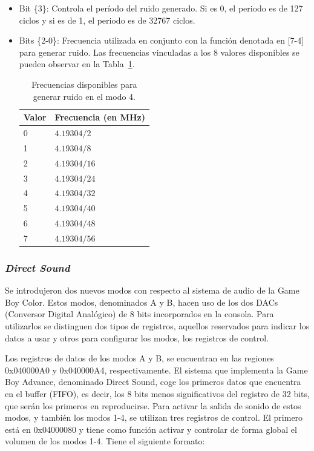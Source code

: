 {\begin{itemize}
	\begin{align}
		Q/2^{valor+1}
		\label{eq:fn_canal_4}
	\end{align}

	\item Bit \{3\}: Controla el período del ruido generado. Si es 0, el periodo es de 127 ciclos y si es de 1, el periodo es de 32767 ciclos.
	\item Bits \{2-0\}: Frecuencia utilizada en conjunto con la función denotada en [7-4] para generar ruido. Las frecuencias vinculadas a los 8 valores disponibles se pueden observar en la Tabla~\ref{tab:frec_canal_4}.

	\begin{table}[h]
		\centering
		\begin{tabular}{| l | l |}
			\hline
			\textbf{Valor} & \textbf{Frecuencia (en MHz)}  \\ \hline
			0 & $4.19304/2$ \\ \hline
			1 & $4.19304/8$ \\ \hline
			2 & $4.19304/16$ \\ \hline
			3 & $4.19304/24$ \\ \hline
			4 & $4.19304/32$ \\ \hline
			5 & $4.19304/40$ \\ \hline
			6 & $4.19304/48$ \\ \hline
			7 & $4.19304/56$ \\ \hline
		\end{tabular}
		\caption{Frecuencias disponibles para generar ruido en el modo 4.}\label{tab:frec_canal_4}
	\end{table}
	\FloatBarrier{}
\end{itemize}

\subsubsection{\textit{Direct Sound}}
Se introdujeron dos nuevos modos con respecto al sistema de audio de la Game Boy Color. Estos modos, denominados A y B, hacen uso de los dos DACs (Conversor Digital Analógico) de 8 bits incorporados en la consola. Para utilizarlos se distinguen dos tipos de registros, aquellos reservados para indicar los datos a usar y otros para configurar los modos, los registros de control.

Los registros de datos de los modos A y B, se encuentran en las regiones 0x040000A0 y 0x040000A4, respectivamente. El sistema que implementa la Game Boy Advance, denominado Direct Sound, coge los primeros datos que encuentra en el buffer (FIFO), es decir, los 8 bits menos significativos del registro de 32 bits, que serán los primeros en reproducirse. Para activar la salida de sonido de estos modos, y también los modos 1-4, se utilizan tres registros de control. El primero está en 0x04000080 y tiene como función activar y controlar de forma global el volumen de los modos 1-4. Tiene el siguiente formato:

}
